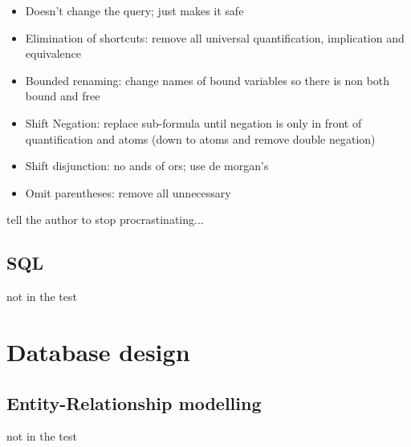 \documentclass[10pt,a4paper]{article}
\begin{document}
\begin{itemize}
\begin{itemize}
				\item Doesn't change the query; just makes it safe
				\item Elimination of shortcuts: remove all universal quantification, implication and equivalence
				\item Bounded renaming: change names of bound variables so there is non both bound and free
				\item Shift Negation: replace sub-formula until negation is only in front of quantification and atoms (down to atoms and remove double negation)
				\item Shift disjunction: no ands of ors; use de morgan's
				\item Omit parentheses: remove all unnecessary 
			\end{itemize}
		\end{itemize}
		tell the author to stop procrastinating...	
	
	\subsection{SQL}
	not in the test

\section{Database design}
	\subsection{Entity-Relationship modelling}
	not in the test
\end{document}
